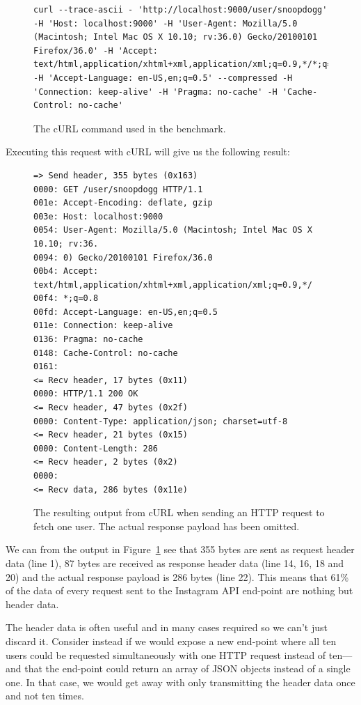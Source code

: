 \documentclass{cslthse-msc}
\begin{document}
\begin{figure}[H]
  \centering
\begin{lstlisting}[breaklines=true]
curl --trace-ascii - 'http://localhost:9000/user/snoopdogg' -H 'Host: localhost:9000' -H 'User-Agent: Mozilla/5.0 (Macintosh; Intel Mac OS X 10.10; rv:36.0) Gecko/20100101 Firefox/36.0' -H 'Accept: text/html,application/xhtml+xml,application/xml;q=0.9,*/*;q=0.8' -H 'Accept-Language: en-US,en;q=0.5' --compressed -H 'Connection: keep-alive' -H 'Pragma: no-cache' -H 'Cache-Control: no-cache'
\end{lstlisting}
  \caption{The cURL command used in the benchmark.}
\end{figure}

Executing this request with cURL will give us the following result:

\begin{figure}[H]
  \centering
\begin{lstlisting}[breaklines=true]
=> Send header, 355 bytes (0x163)
0000: GET /user/snoopdogg HTTP/1.1
001e: Accept-Encoding: deflate, gzip
003e: Host: localhost:9000
0054: User-Agent: Mozilla/5.0 (Macintosh; Intel Mac OS X 10.10; rv:36.
0094: 0) Gecko/20100101 Firefox/36.0
00b4: Accept: text/html,application/xhtml+xml,application/xml;q=0.9,*/
00f4: *;q=0.8
00fd: Accept-Language: en-US,en;q=0.5
011e: Connection: keep-alive
0136: Pragma: no-cache
0148: Cache-Control: no-cache
0161:
<= Recv header, 17 bytes (0x11)
0000: HTTP/1.1 200 OK
<= Recv header, 47 bytes (0x2f)
0000: Content-Type: application/json; charset=utf-8
<= Recv header, 21 bytes (0x15)
0000: Content-Length: 286
<= Recv header, 2 bytes (0x2)
0000:
<= Recv data, 286 bytes (0x11e)
\end{lstlisting}
  \caption{The resulting output from cURL when sending an HTTP request to fetch one user. The actual response payload has been omitted.}
  \label{fig:headers_overhead}
\end{figure}

We can from the output in Figure~\ref{fig:headers_overhead} see that 355 bytes are sent as request header data (line 1), 87 bytes are received as response header data (line 14, 16, 18 and 20) and the actual response payload is 286 bytes (line 22). This means that 61\% of the data of every request sent to the Instagram API end-point are nothing but header data.

The header data is often useful and in many cases required so we can't just discard it. Consider instead if we would expose a new end-point where all ten users could be requested simultaneously with one HTTP request instead of ten---and that the end-point could return an array of JSON objects instead of a single one. In that case, we would get away with only transmitting the header data once and not ten times.
\end{document}
